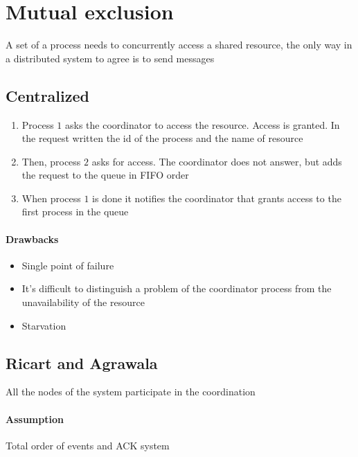 \section{Mutual exclusion}
A set of a process needs to concurrently access a shared resource, the only way in a distributed system to agree is to send messages

\subsection{Centralized}
\begin{enumerate}
    \item Process $1$ asks the coordinator to access the resource. Access is granted. In the request written the id of the process and the name of resource
    \item Then, process $2$ asks for access. The coordinator does not answer, but adds the request to the queue in FIFO order
    \item When process $1$ is done it notifies the coordinator that grants access to the first process in the queue
\end{enumerate}

\paragraph{Drawbacks}
\begin{itemize}
    \item Single point of failure
    \item It’s difficult to distinguish a problem of the coordinator process from the unavailability of the resource
    \item Starvation
\end{itemize}

\subsection{Ricart and Agrawala}
All the nodes of the system participate in the coordination

\paragraph{Assumption} 
Total order of events and ACK system

